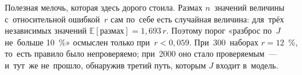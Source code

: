 \begin{ineq}
Полезная мелочь, которая здесь дорого стоила. Размах $n$~значений величины с~относительной ошибкой~$r$ сам по~себе есть случайная величина: для~трёх независимых значений $\mathbb{E}[\text{размах}]=1{,}693\,r$. Поэтому порог «разброс по~$J$ не~больше 10~\%» осмыслен только при~$r<0{,}059$. При~300~наборах $r=12$~\%, то~есть правило было непроверяемо; при~2000 оно стало проверяемым~--- и~тут~же не~прошло, обнаружив третий путь, которым $J$ входит в~модель.
\end{ineq}
